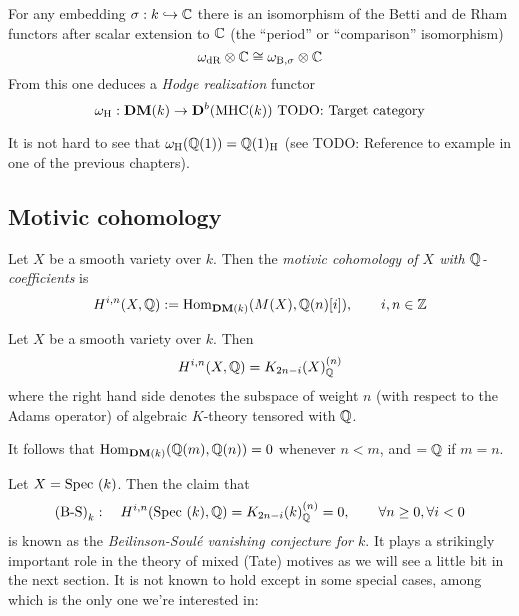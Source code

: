 \begin{exam}\label{exam:9-hodge-realization}
  For any embedding $\sigma:k\hookrightarrow \mathbb{C}$ there is an isomorphism of the
  Betti and de Rham functors after scalar extension to $\mathbb{C}$ (the
  ``period'' or ``comparison'' isomorphism)
  \begin{equation*}
    \omega_{\mathrm{dR}} \otimes \mathbb{C} \cong \omega_{\mathrm{B},\sigma} \otimes \mathbb{C}
  \end{equation*}
  From this one deduces a \emph{Hodge realization} functor
  \begin{equation*}
    \omega_{\mathrm{H}} : \mathbf{DM}(k) \to \mathbf{D}^b(\mathrm{MHC}(k)) \text{ TODO: Target category}
  \end{equation*}

  It is not hard to see that $\omega_{\mathrm{H}}(\mathbb{Q}(1)) =
  \mathbb{Q}(1)_{\mathrm{H}}$ (see TODO: Reference to example in one of the
  previous chapters).
\end{exam}

\subsection{Motivic cohomology}

\begin{defn}
  Let $X$ be a smooth variety over $k$. Then the \emph{motivic
    cohomology of $X$ with $\mathbb{Q}$-coefficients} is
  \begin{equation*}
    H^{i,n}(X, \mathbb{Q}) := \mathrm{Hom}_{\mathbf{DM}(k)}(M(X), \mathbb{Q}(n)[i]), \qquad i,n\in\mathbb{Z}
  \end{equation*}
\end{defn}

\begin{thm}
  Let $X$ be a smooth variety over $k$. Then
  \begin{equation*}
    H^{i,n}(X, \mathbb{Q}) = K_{2n-i}(X)^{(n)}_{\mathbb{Q}}
  \end{equation*}
  where the right hand side denotes the subspace of weight $n$ (with
  respect to the Adams operator) of algebraic $K$-theory tensored with
  $\mathbb{Q}$.
\end{thm}

\begin{exam}\label{exam:9-hom-base}
  It follows that $\mathrm{Hom}_{\mathbf{DM}(k)}(\mathbb{Q}(m),\mathbb{Q}(n))=0$ whenever $n<m$, and
  $=\mathbb{Q}$ if $m=n$.
\end{exam}

\begin{exam}
  Let $X = \mathrm{Spec}~(k)$. Then the claim that 
  \begin{equation*}
    \text{(B-S)}_{k}:\quad H^{i,n}(\mathrm{Spec}~(k), \mathbb{Q}) = K_{2n-i}(k)^{(n)}_{\mathbb{Q}}=0,\qquad \forall n \geq 0, \forall i < 0
  \end{equation*}
  is known as the \emph{Beilinson-Soulé vanishing conjecture for
    $k$}. It plays a strikingly important role in the theory of mixed
  (Tate) motives as we will see a little bit in the next section. It
  is not known to hold except in some special cases, among which is
  the only one we're interested in:
\end{exam}

